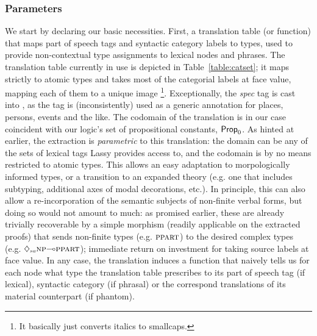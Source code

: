 \subsubsection{Parameters}
We start by declaring our basic necessities.
First, a translation table (or function) that maps part of speech tags and syntactic category labels to types, used to provide non-contextual type assignments to lexical nodes and phrases.
The translation table currently in use is depicted in Table~\ref{table:catset}; it maps strictly to atomic types and takes most of the categorial labels at face value, mapping each of them to a unique image%
\footnote{It basically just converts italics to smallcaps.}.
Exceptionally, the \textit{spec} tag is cast into , as the tag is (inconsistently) used as a generic annotation for places, persons, events and the like.
The codomain of the translation is in our case coincident with our logic's set of propositional constants, $\mathsf{Prop}_0$.
As hinted at earlier, the extraction is \textit{parametric} to this translation: the domain can be any of the sets of lexical tags Lassy provides access to, and the codomain is by no means restricted to atomic types.
This allows an easy adaptation to morpologically informed types, or a transition to an expanded theory (e.g. one that includes subtyping, additional axes of modal decorations, etc.). 
In principle, this can also allow a re-incorporation of the semantic subjects of non-finite verbal forms, but doing so would not amount to much: as promised earlier, these are already trivially recoverable by a simple morphism (readily applicable on the extracted proofs) that sends non-finite types (e.g. $\ppart[s]$) to the desired complex types (e.g. $\ddia{su}\np[s]\li\ppart[s]$); immediate return on investment for taking source labels at face value.
In any case, the translation induces a function that naively tells us for each node what type the translation table prescribes to its part of speech tag (if lexical), syntactic category (if phrasal) or the correspond translations of its material counterpart (if phantom).

